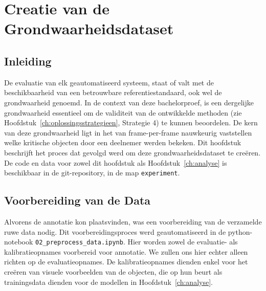 \chapter{Creatie van de Grondwaarheidsdataset}
\label{ch:grondwaarheid}

\section{Inleiding}

De evaluatie van elk geautomatiseerd systeem, staat of valt met de beschikbaarheid 
van een betrouwbare referentiestandaard, ook wel de grondwaarheid genoe\-md.
In de context van deze bachelorproef, is een dergelijke grondwaarheid essentieel om de validiteit  
van de ontwikkelde methoden (zie Hoofdstuk~\ref{ch:oplossingsstrategieen}, Strategie 4) te kunnen beoordelen.
De kern van deze grondwaarheid ligt in het van frame-per-frame nauwkeurig vaststellen welke kritische objecten 
door een deelnemer werden bekeken.
Dit hoofdstuk beschrijft het proces dat gevolgd werd om deze grondwaarheidsdataset te creëren.
De code en data voor zowel dit hoofdstuk als Hoofdstuk~\ref{ch:analyse} is beschikbaar in de git-repository,
in de map \texttt{experiment}.

\section{Voorbereiding van de Data}

Alvorens de annotatie kon plaatsvinden, was een voorbereiding van de verzamelde ruwe data nodig.
Dit voorbereidingsproces werd geautomatiseerd in de python-notebook \texttt{02\_preprocess\_data.ipynb}.
Hier worden zowel de evaluatie- als kalibratieopnames voorbereid voor annotatie. 
We zullen ons hier echter alleen richten op de evaluatieopnames.
De kalibratieopnames dienden enkel voor het creëren van visuele voorbeelden van de objecten,
die op hun beurt als trainingsdata dienden voor de modellen in Hoofdstuk~\ref{ch:analyse}.

